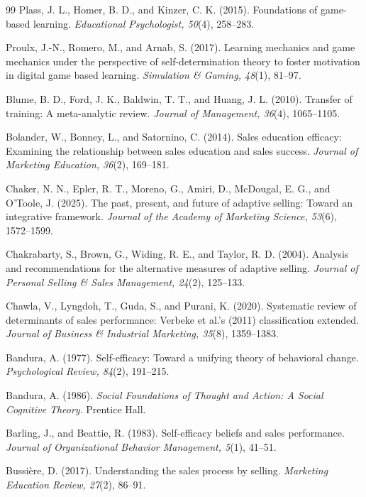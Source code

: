 \documentclass[12pt]{report}
\begin{document}
\begin{thebibliography}{99}
Plass, J. L., Homer, B. D., and Kinzer, C. K. (2015).
Foundations of game-based learning.
\textit{Educational Psychologist, 50}(4), 258--283.

Proulx, J.-N., Romero, M., and Arnab, S. (2017).
Learning mechanics and game mechanics under the perspective of self-determination theory to foster motivation in digital game based learning.
\textit{Simulation \& Gaming, 48}(1), 81--97.

Blume, B. D., Ford, J. K., Baldwin, T. T., and Huang, J. L. (2010).
Transfer of training: A meta-analytic review.
\textit{Journal of Management, 36}(4), 1065--1105.

Bolander, W., Bonney, L., and Satornino, C. (2014).
Sales education efficacy: Examining the relationship between sales education and sales success.
\textit{Journal of Marketing Education, 36}(2), 169--181.

Chaker, N. N., Epler, R. T., Moreno, G., Amiri, D., McDougal, E. G., and O'Toole, J. (2025).
The past, present, and future of adaptive selling: Toward an integrative framework.
\textit{Journal of the Academy of Marketing Science, 53}(6), 1572--1599.

Chakrabarty, S., Brown, G., Widing, R. E., and Taylor, R. D. (2004).
Analysis and recommendations for the alternative measures of adaptive selling.
\textit{Journal of Personal Selling \& Sales Management, 24}(2), 125--133.

Chawla, V., Lyngdoh, T., Guda, S., and Purani, K. (2020).
Systematic review of determinants of sales performance: Verbeke et al.'s (2011) classification extended.
\textit{Journal of Business \& Industrial Marketing, 35}(8), 1359--1383.

Bandura, A. (1977).
Self-efficacy: Toward a unifying theory of behavioral change.
\textit{Psychological Review, 84}(2), 191--215.

Bandura, A. (1986).
\textit{Social Foundations of Thought and Action: A Social Cognitive Theory}.
Prentice Hall.

Barling, J., and Beattie, R. (1983).
Self-efficacy beliefs and sales performance.
\textit{Journal of Organizational Behavior Management, 5}(1), 41--51.

Bussi\`ere, D. (2017).
Understanding the sales process by selling.
\textit{Marketing Education Review, 27}(2), 86--91.


\end{thebibliography}
\end{document}
